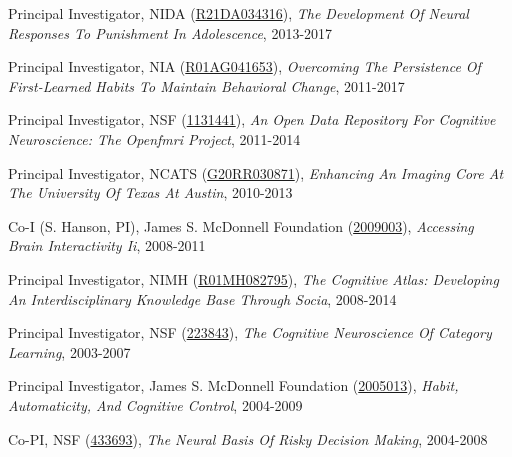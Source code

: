 \documentclass[10pt, letterpaper]{article}
\begin{document}
Principal Investigator, NIDA (\href{http://projectreporter.nih.gov/project_info_description.cfm?aid=8662735}{R21DA034316}), \textit{The Development Of Neural Responses To Punishment In Adolescence}, 2013-2017 \vspace{2mm}

Principal Investigator, NIA (\href{http://projectreporter.nih.gov/project_info_description.cfm?aid=8968152}{R01AG041653}), \textit{Overcoming The Persistence Of First-Learned Habits To Maintain Behavioral Change}, 2011-2017 \vspace{2mm}

Principal Investigator, NSF (\href{http://grants.uberresearch.com/100000001/1131441/CRCNS-Data-Sharing-An-open-data-repository-for-cognitive-neuroscience-The-OpenfMRI-Project}{1131441}), \textit{An Open Data Repository For Cognitive Neuroscience: The Openfmri Project}, 2011-2014 \vspace{2mm}

Principal Investigator, NCATS (\href{http://projectreporter.nih.gov/project_info_description.cfm?aid=7934944}{G20RR030871}), \textit{Enhancing An Imaging Core At The University Of Texas At Austin}, 2010-2013 \vspace{2mm}

Co-I (S. Hanson, PI), James S. McDonnell Foundation (\href{https://www.jsmf.org/grants/2009003/}{2009003}), \textit{Accessing Brain Interactivity Ii}, 2008-2011 \vspace{2mm}

Principal Investigator, NIMH (\href{http://projectreporter.nih.gov/project_info_description.cfm?aid=8228112}{R01MH082795}), \textit{The Cognitive Atlas: Developing An Interdisciplinary Knowledge Base Through Socia}, 2008-2014 \vspace{2mm}

Principal Investigator, NSF (\href{http://grants.uberresearch.com/100000001/0223843/COLLABORATIVE-RESEARCH-The-Cognitive-Neuroscience-of-Category-Learning}{223843}), \textit{The Cognitive Neuroscience Of Category Learning}, 2003-2007 \vspace{2mm}

Principal Investigator, James S. McDonnell Foundation (\href{https://www.jsmf.org/grants/2005013/}{2005013}), \textit{Habit, Automaticity, And Cognitive Control}, 2004-2009 \vspace{2mm}

Co-PI, NSF (\href{http://grants.uberresearch.com/100000001/0433693/The-Neural-Basis-of-Risky-Decision-Making}{433693}), \textit{The Neural Basis Of Risky Decision Making}, 2004-2008 \vspace{2mm}
\end{document}
